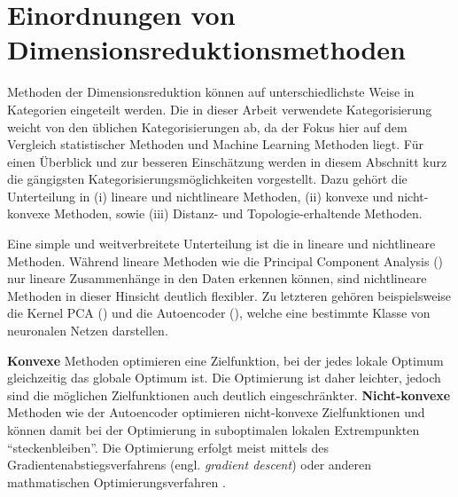 \section{Einordnungen von Dimensionsreduktionsmethoden}
\label{ch:Dimensionsreduktion:Ansaetze}
Methoden der Dimensionsreduktion können auf unterschiedlichste Weise in Kategorien eingeteilt werden. Die in dieser Arbeit verwendete Kategorisierung weicht von den üblichen Kategorisierungen ab, da der Fokus hier auf dem Vergleich statistischer Methoden und Machine Learning Methoden liegt. Für einen Überblick und zur besseren Einschätzung werden in diesem Abschnitt kurz die gängigsten Kategorisierungsmöglichkeiten vorgestellt. Dazu gehört die Unterteilung in (i) lineare und nichtlineare Methoden, (ii) konvexe und nicht-konvexe Methoden, sowie (iii) Distanz- und Topologie-erhaltende Methoden.

Eine simple und weitverbreitete Unterteilung ist die in lineare und nichtlineare Methoden. Während
lineare Methoden wie die Principal Component Analysis
() nur lineare Zusammenhänge in den Daten erkennen
können, sind nichtlineare Methoden in dieser Hinsicht deutlich flexibler. Zu letzteren gehören
beispielsweise die Kernel PCA () und die Autoencoder
(), welche eine bestimmte Klasse von neuronalen Netzen
darstellen.

\textbf{Konvexe} Methoden optimieren eine Zielfunktion, bei der jedes lokale Optimum gleichzeitig das globale Optimum ist. Die Optimierung ist daher leichter, jedoch sind die möglichen Zielfunktionen auch deutlich eingeschränkter. \textbf{Nicht-konvexe} Methoden wie der Autoencoder optimieren nicht-konvexe Zielfunktionen und können damit bei der Optimierung in suboptimalen lokalen Extrempunkten \enquote{steckenbleiben}. Die Optimierung erfolgt meist mittels des Gradientenabstiegsverfahrens (engl. \textit{gradient descent}) oder anderen mathmatischen Optimierungsverfahren \parencite[siehe z.B.][]{Guler.2010}.

